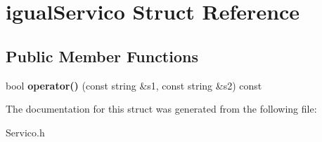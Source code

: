\hypertarget{structigual_servico}{}\section{igual\+Servico Struct Reference}
\label{structigual_servico}
\subsection*{Public Member Functions}
\begin{DoxyCompactItemize}
\item 
bool {\bfseries operator()} (const string \&s1, const string \&s2) const \hypertarget{structigual_servico_a12ee454ef7899d5d79eec9343d120974}{}\label{structigual_servico_a12ee454ef7899d5d79eec9343d120974}

\end{DoxyCompactItemize}


The documentation for this struct was generated from the following file\+:\begin{DoxyCompactItemize}
\item 
Servico.\+h\end{DoxyCompactItemize}
